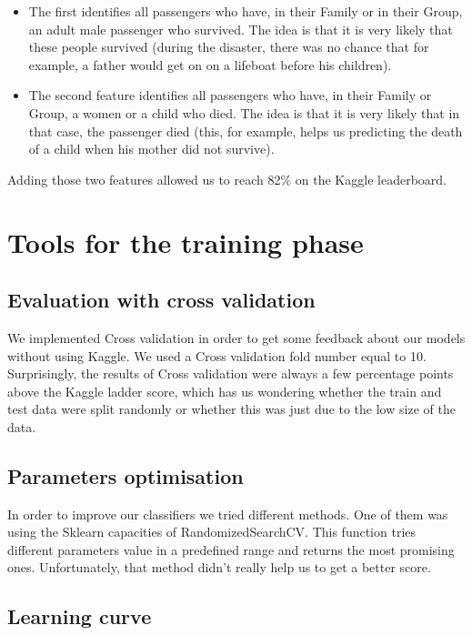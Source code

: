 \documentclass[a4paper,10pt]{article}
\begin{document}
\begin{itemize}
\item The first identifies all passengers who have, in their Family or in their Group, an adult male passenger who survived. The idea is that it is very likely that these people survived (during the disaster, there was no chance that for example, a father would get on on a lifeboat before his children).
\item The second feature identifies all passengers who have, in their Family or Group, a women or a child who died. The idea is that it is very likely that in that case, the passenger died (this, for example, helps us predicting the death of a child when his mother did not survive).
\end{itemize}

Adding those two features allowed us to reach 82\% on the Kaggle leaderboard.

\section{Tools for the training phase}

\subsection{Evaluation with cross validation}

We implemented Cross validation in order to get some feedback about our models without using Kaggle. We used a Cross validation fold number equal to 10. Surprisingly, the results of Cross validation were always a few percentage points above the Kaggle ladder score, which has us wondering whether the train and test data were split randomly or whether this was just due to the low size of the data.

\subsection{Parameters optimisation}

In order to improve our classifiers we tried different methods. One of them was using the Sklearn capacities of RandomizedSearchCV. This function tries different parameters value in a predefined range and returns the most promising ones. Unfortunately, that method didn't really help us to get a better score.

\subsection{Learning curve}
\end{document}
